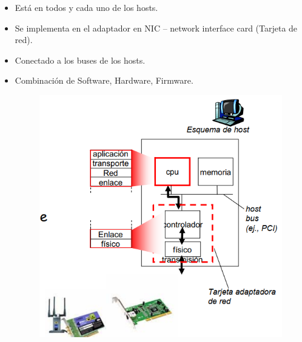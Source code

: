 \documentclass[12pt, twoside, openright]{report} %
\begin{document}
    \begin{itemize}
    \item
      Está en todos y cada uno de los hosts.
    \item
      Se implementa en el adaptador en NIC -- network interface card
      (Tarjeta de red).
    \item
      Conectado a los buses de los hosts.
    \item
      Combinación de Software, Hardware, Firmware.
      \begin{figure}[H]
        {\includegraphics[scale=.3]{Untitled 46.png}}
      \end{figure}
    \end{itemize}
\end{document}
